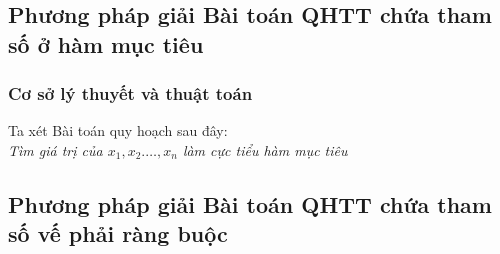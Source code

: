 \documentclass{article}
\begin{document}
\subsection{Phương pháp giải Bài toán QHTT chứa tham số ở hàm mục tiêu}
\subsubsection{Cơ sở lý thuyết và thuật toán}
Ta xét Bài toán quy hoạch sau đây:\\
\textit{Tìm giá trị của $x_1,x_2.\ldots,x_n$ làm cực tiểu hàm
 mục tiêu}

\subsection{Phương pháp giải Bài toán QHTT chứa tham số vế phải ràng buộc}



           
\end{document}
